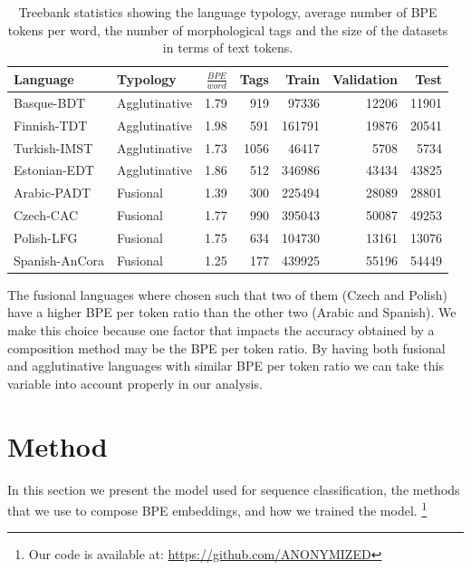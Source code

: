 \documentclass[11pt]{article}
\newcommand\jp[1]{(\textbf{JP:} #1)}
\begin{document}

    
    
    	\begin{table} %
		\centering
		\begin{tabular}{l|lrrrrr}
			Language & Typology & $\frac{BPE}{word}$ & Tags & Train & Validation & Test \\
			\hline
			Basque-BDT      & Agglutinative & 1.79 & 919 & 97336 & 12206 & 11901 \\
			Finnish-TDT     & Agglutinative & 1.98 & 591 & 161791 & 19876 & 20541 \\
			Turkish-IMST    & Agglutinative & 1.73 & 1056 & 46417 & 5708 & 5734 \\
			Estonian-EDT    & Agglutinative & 1.86 & 512 & 346986 & 43434 & 43825 \\
            Arabic-PADT     & Fusional & 1.39 & 300 & 225494 & 28089 & 28801  \\
			Czech-CAC       & Fusional & 1.77 & 990 & 395043 & 50087 & 49253 \\
			Polish-LFG      & Fusional & 1.75 & 634 & 104730 & 13161 & 13076 \\
			Spanish-AnCora  & Fusional & 1.25 & 177 & 439925 & 55196 & 54449 \\
        \end{tabular}
    		\caption{\label{tab:data} Treebank statistics showing the
     language typology, average number of BPE tokens per word, the
     number of morphological tags and the size of the datasets in
     terms of text tokens.}
	\end{table}
    
        The fusional languages where chosen such that two of them
        (Czech and Polish) have a higher BPE per token ratio than the
        other two (Arabic and Spanish). We make this choice because
        one factor that impacts the accuracy obtained by a composition
        method may be the BPE per token ratio.  By having both
        fusional and agglutinative languages with similar BPE per
        token ratio we can take this variable into account properly in
        our analysis.
        
	\section{Method}
	\label{method}
    	In this section we present the model used for sequence
     classification, the methods that we use to compose BPE
     embeddings, and how we trained the model. \footnote{Our code is
     available at: \url{https://github.com/ANONYMIZED}}
\end{document}

